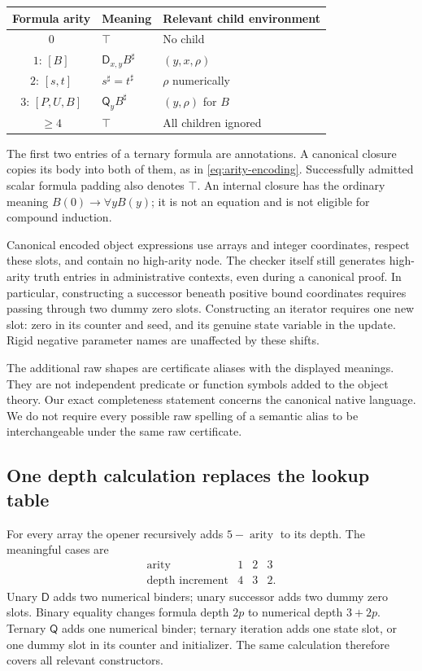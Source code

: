 \documentclass[11pt,letterpaper]{article}
\theoremstyle{definition}\newtheorem{definition}[theorem]{Definition}
\theoremstyle{remark}\newtheorem{remark}[theorem]{Remark}
\newcommand{\D}{\mathsf D}
\newcommand{\Q}{\mathsf Q}
\begin{document}
\begin{center}
\begin{tabular}{cll}
\toprule
Formula arity & Meaning & Relevant child environment\\
\midrule
$0$ & $\top$ & No child\\
$1$: $[B]$ & $\D_{x,y}B^\sharp$ & $(y,x,\rho)$\\
$2$: $[s,t]$ & $s^\sharp=t^\sharp$ & $\rho$ numerically\\
$3$: $[P,U,B]$ & $\Q_yB^\sharp$ & $(y,\rho)$ for $B$\\
$\geq4$ & $\top$ & All children ignored\\
\bottomrule
\end{tabular}
\end{center}

The first two entries of a ternary formula are annotations.  A canonical
closure copies its body into both of them, as in
\eqref{eq:arity-encoding}.  Successfully admitted scalar formula padding
also denotes $\top$.  An internal closure has the ordinary meaning
$B(0)\to\forall yB(y)$; it is not an equation and is not eligible for
compound induction.

Canonical encoded object expressions use arrays and integer coordinates,
respect these slots, and contain no high-arity node.  The checker itself
still generates high-arity truth entries in administrative contexts,
even during a canonical proof.  In particular, constructing a
successor beneath positive bound coordinates requires passing through
two dummy zero slots.  Constructing an iterator requires one new slot:
zero in its counter and seed, and its genuine state variable in the
update.  Rigid negative parameter names are unaffected by these shifts.

The additional raw shapes are certificate aliases with the displayed
meanings.  They are not independent predicate or function symbols added
to the object theory.  Our exact completeness statement concerns the
canonical native language.  We do not require every possible raw spelling
of a semantic alias to be interchangeable under the same raw certificate.

\subsection{One depth calculation replaces the lookup table}

For every array the opener recursively adds $5-\operatorname{arity}$
to its depth.  The meaningful cases are
\[
\begin{array}{c|ccc}
 \operatorname{arity}&1&2&3\\\hline
 \text{depth increment}&4&3&2.
\end{array}
\]
Unary $\D$ adds two numerical binders; unary successor adds two dummy
zero slots.  Binary equality changes formula depth $2p$ to numerical
depth $3+2p$.  Ternary $\Q$ adds one numerical binder; ternary iteration
adds one state slot, or one dummy slot in its counter and initializer.
The same calculation therefore covers all relevant constructors.
\end{document}
